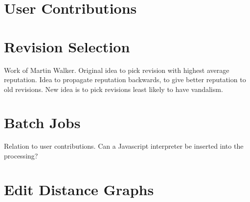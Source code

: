 \chapter{User Contributions}

\chapter{Revision Selection}
    Work of Martin Walker.
    Original idea to pick revision with highest average reputation.
    Idea to propagate reputation backwards, to give better reputation
    to old revisions.
    New idea is to pick revisions least likely to have vandalism.

\chapter{Batch Jobs}

    Relation to user contributions.
    Can a Javascript interpreter be inserted into the processing?

\chapter{Edit Distance Graphs}

